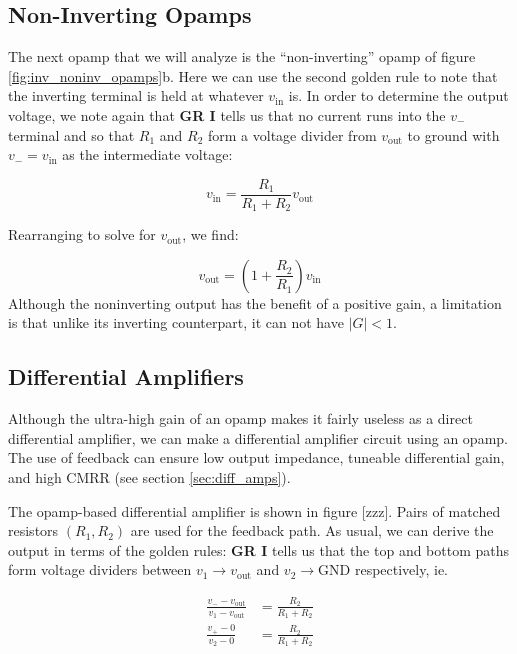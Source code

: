\documentclass[]{article}
\begin{document}
\subsection{Non-Inverting Opamps}
The next opamp that we will analyze is the ``non-inverting'' opamp of figure \ref{fig:inv_noninv_opamps}b. Here we can use the second golden rule to note that the inverting terminal is held at whatever $v_\text{in}$ is. In order to determine the output voltage, we note again that \textbf{GR I} tells us that no current runs into the $v_-$ terminal and so that $R_1$ and $R_2$ form a voltage divider from $v_\text{out}$ to ground with $v_- = v_\text{in}$ as the intermediate voltage:

\begin{equation}
\label{eq:noninverting_opamp_deriv_1}
v_\text{in} = \frac{R_1}{R_1 + R_2}v_\text{out}
\end{equation}

Rearranging to solve for $v_\text{out}$, we find: 

\begin{equation}
\label{eq:noninverting_opamp}
v_\text{out} = \left(1+\frac{R_2}{R_1}\right)v_\text{in}
\end{equation}
Although the noninverting output has the benefit of a positive gain, a limitation is that unlike its inverting counterpart, it can not have $\vert G\vert < 1$.

\subsection{Differential Amplifiers}
Although the ultra-high gain of an opamp makes it fairly useless as a direct differential amplifier, we can make a differential amplifier circuit using an opamp. The use of feedback can ensure low output impedance, tuneable differential gain, and high CMRR (see section \ref{sec:diff_amps}).

The opamp-based differential amplifier is shown in figure [zzz]. Pairs of matched resistors $\left(R_1,R_2\right)$ are used for the feedback path. As usual, we can derive the output in terms of the golden rules: \textbf{GR I} tells us that the top and bottom paths form voltage dividers between $v_1\rightarrow v_\text{out}$ and $v_2\rightarrow \text{GND}$ respectively, ie.

\begin{align*}
\frac{v_--v_\text{out}}{v_1-v_\text{out}} &= \frac{R_2}{R_1+R_2} \\
\frac{v_+-0}{v_2-0} &= \frac{R_2}{R_1+R_2} 
\end{align*}
\end{document}
